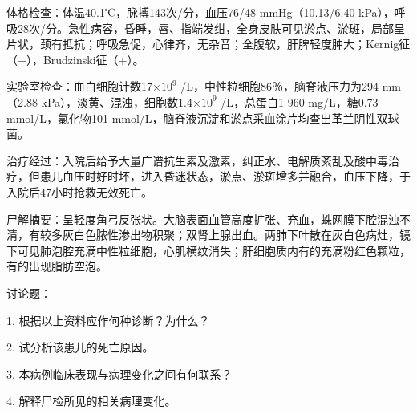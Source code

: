体格检查：体温40.1℃，脉搏143次/分，血压76/48 mmHg（10.13/6.40
kPa），呼吸28次/分。急性病容，昏睡，唇、指端发绀，全身皮肤可见淤点、淤斑，局部呈片状，颈有抵抗；呼吸急促，心律齐，无杂音；全腹软，肝脾轻度肿大；Kernig征（+），Brudzinski征（+）。

实验室检查：血白细胞计数17$\times 10^9$ /L，中性粒细胞86％，脑脊液压力为294
mm（2.88 kPa），淡黄、混浊，细胞数1.4$\times 10^9$
/L，总蛋白1 960
mg/L，糖0.73 mmol/L，氯化物101
mmol/L，脑脊液沉淀和淤点采血涂片均查出革兰阴性双球菌。

治疗经过：入院后给予大量广谱抗生素及激素，纠正水、电解质紊乱及酸中毒治疗，但患儿血压时好时坏，进入昏迷状态，淤点、淤斑增多并融合，血压下降，于入院后47小时抢救无效死亡。

尸解摘要：呈轻度角弓反张状。大脑表面血管高度扩张、充血，蛛网膜下腔混浊不清，有较多灰白色脓性渗出物积聚；双肾上腺出血。两肺下叶散在灰白色病灶，镜下可见肺泡腔充满中性粒细胞，心肌横纹消失；肝细胞质内有的充满粉红色颗粒，有的出现脂肪空泡。

讨论题：

1. 根据以上资料应作何种诊断？为什么？

2. 试分析该患儿的死亡原因。

3. 本病例临床表现与病理变化之间有何联系？

4. 解释尸检所见的相关病理变化。